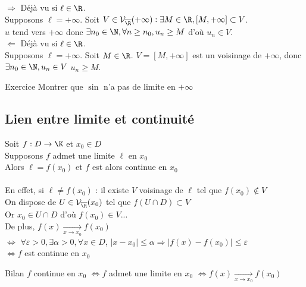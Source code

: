 \documentclass[12pt,a4paper]{report}
\begin{document}
\begin{demo}
$\Longrightarrow$ Déjà vu si $\ell \in \R$. \\
Supposons $\ell = +\infty$. Soit $V \in \mathcal{V}_{\overline{\R}}(+\infty) : \exists M \in \R, [M, +\infty] \subset V$. \\
$u$ tend vers $+\infty$ donc $\exists n_0 \in \N, \forall n \geq n_0, u_n \geq M$ d'où $u_n \in V$.\\
$\Longleftarrow$ Déjà vu si $\ell \in \R$. \\
Supposons $\ell = +\infty$. Soit $M \in \R$. $V = [M,+\infty]$ est un voisinage de $+\infty$, donc \\ $\exists n_0 \in \N, u_n \in V$ \ie $u_n \geq M$.
\end{demo}

\begin{application}{Exercice}{}
Montrer que $\sin$ n'a pas de limite en $+ \infty$
\end{application}

\subsection{Lien entre limite et continuité}

Soit $f: D \rightarrow \K$ et $x_0 \in D$\\
Supposons $f$ admet une limite $\ell$ en $x_0$ \\
Alors $\ell=f(x_0)$ et $f$ est alors continue en $x_0$ \\
\\
En effet, si $\ell \neq f(x_0)$ : il existe $V$ voisinage de $\ell$ tel que $f(x_0) \notin V$\\
On dispose de $U\in \mathcal{V}_{\overline{\R}} (x_0)$ tel que $f(U\cap D) \subset V $\\
Or $x_0 \in U\cap D$ d'où $f(x_0) \in V ...$\\
De plus, $f(x) \xrightarrow[x \to x_0]{} f(x_0)$\\
$\Longleftrightarrow$ $\forall \varepsilon >0, \exists \alpha > 0, \forall x \in D$, $\lvert x-x_0 \rvert \leq \alpha \Longrightarrow \lvert f(x) - f(x_0) \rvert \leq \varepsilon$\\
$\Longleftrightarrow f$ est continue en $x_0$

\begin{proposition}{Bilan}{}
$f$ continue en $x_0$ $\Longleftrightarrow f$ admet une limite en $x_0$ $\Longleftrightarrow f(x) \xrightarrow[x\rightarrow x_0]{} f(x_0)$ 
\end{proposition}
\end{document}

